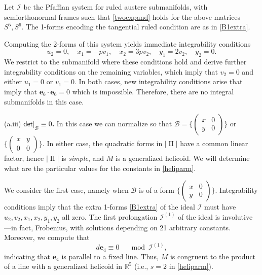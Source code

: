 \documentclass[12pt,reqno]{amsart}
\theoremstyle{definition}
\theoremstyle{remark}
\begin{document}
Let ${{\mathcal I}}$ be the Pfaffian system for ruled austere submanifolds, with semiorthonormal frames such
that \eqref{twoexpand} holds for the above matrices $S^5, S^6$.
The 1-forms encoding the tangential ruled condition are as in \eqref{B1extra}.

Computing the 2-forms of this system yields immediate integrability conditions
$$u_2=0, \quad x_1 = -p v_1, \quad x_2 = 3p v_2, \quad y_1 = 2 v_2, \quad y_2=0.$$
We restrict to the submanifold where these conditions hold and derive further integrability
conditions on the remaining variables, which imply that $v_2=0$ and either $u_1=0$ or $v_1=0$.
In both cases, new integrability conditions arise that imply that ${\mathbf e}_6 \cdot {\mathbf e}_6=0$ which is impossible.
Therefore, there are no integral submanifolds in this case.

(a.iii) {\bf  ${\mathsf{det}}|_{\mathcal B}\equiv 0$.} In this case we can normalize so that
${\mathcal B}= \{ \left( \begin{smallmatrix} x & 0 \\ y & 0 \end{smallmatrix}\right) \}$ or
$\{ \left( \begin{smallmatrix} x & y \\0 & 0 \end{smallmatrix}\right) \}$. In either case,  the quadratic forms in $|{\operatorname{II}} |$
have a common linear factor, hence  $|{\operatorname{II}} |$ is {\it simple}, and $M$ is a generalized helicoid.  We will determine what
are the particular values for the constants in \eqref{heliparm}.

We consider the first case, namely when ${\mathcal B}$ is of a form $\{ \left( \begin{smallmatrix} x & 0\\y & 0 \end{smallmatrix}\right) \}$.
Integrability conditions imply that the extra 1-forms \eqref{B1extra} of the ideal ${{\mathcal I}}$ must
have $u_2, v_2,x_1, x_2,y_1,y_2$ all zero. The first prolongation ${{\mathcal I}} ^{(1)}$ of the ideal is
involutive---in fact, Frobenius, with solutions depending on 21 arbitrary constants.  Moreover, we compute that
$$d {\mathbf e}_4\equiv 0 \quad \mod {{\mathcal I}}^{(1)},$$
indicating that ${\mathbf e}_4$ is parallel to a fixed line.  Thus, $M$ is congruent to the product of a line with a
generalized helicoid in ${\mathbb R}^5$ (i.e., $s=2$ in \eqref{heliparm}).
\end{document}
